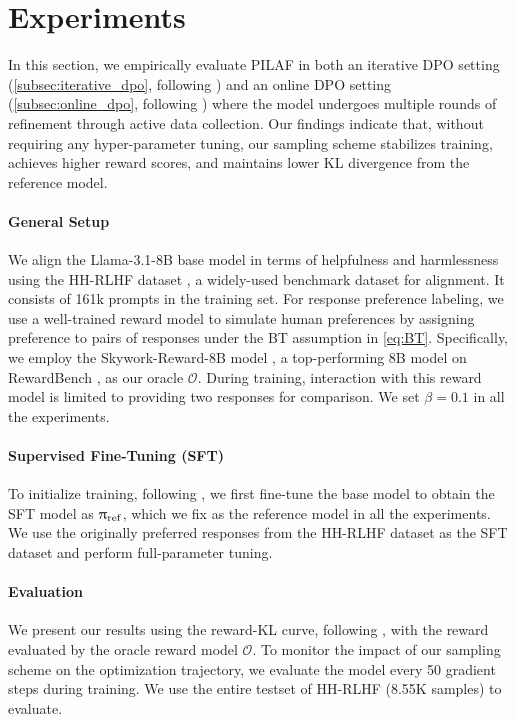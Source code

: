 \section{Experiments}\label{sec:exp}

In this section, we empirically evaluate PILAF in both an iterative DPO setting (\cref{subsec:iterative_dpo}, following \citet{xiong2024iterative, dong2024rlhf}) and an online DPO setting (\cref{subsec:online_dpo}, following \citet{guo2024direct}) where the model undergoes multiple rounds of refinement through active data collection. Our findings indicate that, without requiring any hyper-parameter tuning, our sampling scheme stabilizes training, achieves higher reward scores, and maintains lower KL divergence from the reference model.

\paragraph{General Setup} We align the Llama-3.1-8B base model \citep{dubey2024llama} in terms of helpfulness and harmlessness using the HH-RLHF dataset \citep{bai2022training}, a widely-used benchmark dataset for alignment. It consists of 161k prompts in the training set. For response preference labeling, we use a well-trained reward model to simulate human preferences by assigning preference to pairs of responses under the BT assumption in  \cref{eq:BT}. Specifically, we employ the Skywork-Reward-8B model \citep{liu2024skywork}, a top-performing 8B model on RewardBench \citep{RewardBench}, as our oracle $\mathcal{O}$. During training, interaction with this reward model is limited to providing two responses for comparison. We set $\beta=0.1$ in all the experiments.

\paragraph{Supervised Fine-Tuning (SFT)} To initialize training, following \citet{rafailov2023direct}, we first fine-tune the base model to obtain the SFT model as $\uppi_{{\rm ref}}$, which we fix as the reference model in all the experiments. We use the originally preferred responses from the HH-RLHF dataset as the SFT dataset and perform full-parameter tuning.

\paragraph{Evaluation} We present our results using the reward-KL curve, following \citet{gao2023scaling}, with the reward evaluated by the oracle reward model $\mathcal{O}$. To monitor the impact of our sampling scheme on the optimization trajectory, we evaluate the model every 50 gradient steps during training. We use the entire testset of HH-RLHF (8.55K samples) to evaluate.

